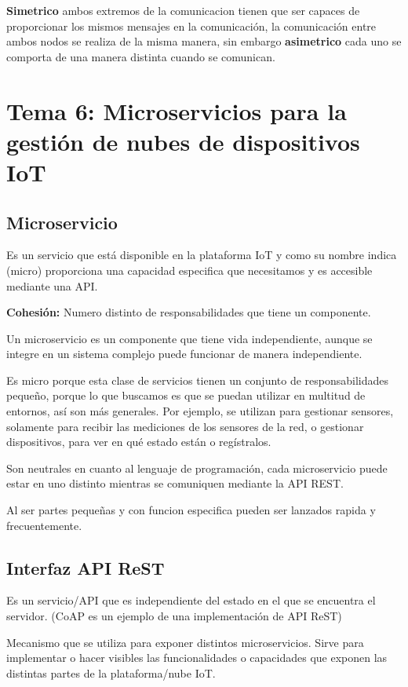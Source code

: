 \documentclass[12pt]{report} %
\begin{document}
\textbf{Simetrico} ambos extremos de la comunicacion tienen que ser capaces de proporcionar los mismos mensajes en la comunicación, la comunicación entre ambos nodos se realiza de la misma manera, sin embargo \textbf{asimetrico} cada uno se comporta de una manera distinta cuando se comunican. 

\chapter{Tema 6: Microservicios para la gestión de nubes de dispositivos IoT}
\section{Microservicio}
Es un servicio que está disponible en la plataforma IoT y como su nombre indica (micro) proporciona una capacidad especifica que necesitamos y es accesible mediante una API.

\textbf{Cohesión:} Numero distinto de responsabilidades que tiene un componente.

Un microservicio es un componente que tiene vida independiente, aunque se integre en un sistema complejo puede funcionar de manera independiente.

Es micro porque esta clase de servicios tienen un conjunto de responsabilidades pequeño, porque lo que buscamos es que se puedan utilizar en multitud de entornos, así son más generales. Por ejemplo, se utilizan para gestionar sensores, solamente para recibir las mediciones de los sensores de la red, o gestionar dispositivos, para ver en qué estado están o regístralos.

Son neutrales en cuanto al lenguaje de programación, cada microservicio puede estar en uno distinto mientras se comuniquen mediante la API REST.

Al ser partes pequeñas y con funcion especifica pueden ser lanzados rapida y frecuentemente.

\section{Interfaz API ReST}
Es un servicio/API que es independiente del estado en el que se encuentra el servidor. (CoAP es un ejemplo de una implementación de API ReST)

Mecanismo que se utiliza para exponer distintos microservicios. Sirve para implementar o hacer visibles las funcionalidades o capacidades que exponen las distintas partes de la plataforma/nube IoT.
\end{document}
